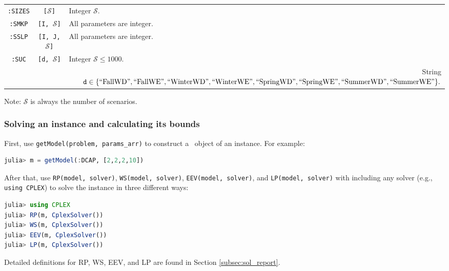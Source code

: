 \begin{table}[H]
{\begin{threeparttable}
\begin{tabular}{@{}ccl@{}}
				\texttt{:SIZES}              & \texttt{[$\mathcal{S}$]}          & Integer $\mathcal{S}$.                                                                                   \\
				\texttt{:SMKP}               & \texttt{[I, $\mathcal{S}$]}       & All parameters are integer.                                                                                                                \\
				\texttt{:SSLP}               & \texttt{[I, J, $\mathcal{S}$]}    & All parameters are integer.                                                                                                                \\
				\texttt{:SUC}                & \texttt{[d, $\mathcal{S}$]}       & \multicolumn{1}{l}{Integer $\mathcal{S}\le 1000$.}                                             \\
				\multicolumn{1}{l}{}         & \multicolumn{1}{l}{}            & \multicolumn{1}{r}{String $\texttt{d}\in \{\mathrm{``FallWD"}, \mathrm{``FallWE"}, \mathrm{``WinterWD"}, \mathrm{``WinterWE"}, \mathrm{``SpringWD"}, \mathrm{``SpringWE"}, \mathrm{``SummerWD"}, \mathrm{``SummerWE"} \}.$}\\				
				\bottomrule
			\end{tabular}
			\begin{tablenotes}
				\item Note: $\mathcal{S}$ is always the number of scenarios.
			\end{tablenotes}
		\end{threeparttable}
	}
\end{table}

\subsubsection{Solving an instance and calculating its bounds}
First, use \texttt{getModel(problem, params\_arr)} to construct a \jumpmodel\ object of an instance. For example:
\begin{lstlisting}[frame=single,language=julia]
julia> m = getModel(:DCAP, [2,2,2,10])
\end{lstlisting}
After that, use \texttt{RP(model, solver)}, \texttt{WS(model, solver)}, \texttt{EEV(model, solver)}, and \texttt{LP(model, solver)} with including any solver (e.g., \texttt{using CPLEX}) to solve the instance in three different ways:
\begin{lstlisting}[frame=single,language=julia]
julia> using CPLEX
julia> RP(m, CplexSolver())
julia> WS(m, CplexSolver())
julia> EEV(m, CplexSolver())
julia> LP(m, CplexSolver())
\end{lstlisting}
Detailed definitions for RP, WS, EEV, and LP are found in Section \ref{subsec:sol_report}.

